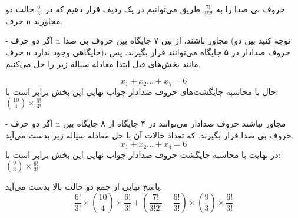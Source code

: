 \p
حروف بی صدا را به 
$\frac{7!}{3!2!}$
طریق می‌توانیم در یک ردیف قرار دهیم که در 
$\frac{6!}{3!}$
حالت دو حرف n مجاورند.

-
اگر دو حرف n مجاور باشند، 
از بین ۷ جایگاه بین حروف بی صدا (توجه کنید بین دو حرف n جایگاهی وجود ندارد)، حروف صدادار در ۵ جایگاه می‌توانند قرار بگیرند.
پس مانند بخش‌های قبل ابتدا معادله سیاله زیر را حل می‌کنیم.

$$x_1 + x_2 \ldots + x_5 = 6$$
حال با محاسبه جایگشت‌های حروف صدادار جواب نهایی این بخش برابر است با:
$\binom{10}{4}\times\frac{6!}{3!}$

-
اگر دو حرف n مجاور نباشند حروف صدادار می‌توانند در ۴ جایگاه از ۸ جایگاه بین حروف بی صدا قرار بگیرند. که تعداد حالات آن با حل معادله سیاله زیر بدست می‌آید.
$$x_1 + x_2 \ldots + x_4 = 6$$
در نهایت با محاسبه جایگشت حروف صدادار جواب نهایی این بخش برابر است با:
$\binom{9}{3}\times\frac{6!}{3!}$

پاسخ نهایی از جمع دو حالت بالا بدست می‌آید.
$$\frac{6!}{3!}\times\binom{10}{4}\times\frac{6!}{3!}+ (\frac{7!}{3!2!} - \frac{6!}{3!})\times\binom{9}{3}\times\frac{6!}{3!}$$
